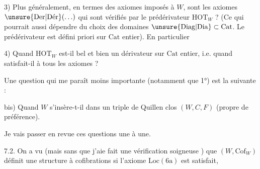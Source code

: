 3) Plus généralement, en termes des axiomes imposés à $W$,  sont les axiomes $\unsure{\mathrm{Der}|\mathrm{D\acute er}}(\ldots)$ qui sont vérifiés par le prédérivateur $\mathrm{HOT}_W$ ? (Ce qui pourrait aussi dépendre du choix des domaines $\unsure{\mathrm{Diag}|\mathrm{Dia}}\subset\mathrm{Cat}$. Le prédérivateur est défini  priori sur $\mathrm{Cat}$  entier). En particulier

4) Quand $\mathrm{HOT}_W$ est-il bel et bien un dérivateur sur $\mathrm{Cat}$  entier, i.e. quand satisfait-il à tous les axiomes ?

Une question qui me paraît moins importante (notamment que 1°) est la suivante :

 bis) Quand $W$ s'insère-t-il dans un triple de Quillen clos $(W,C,F)$ (propre de préférence).

Je vais passer en revue ces questions une à une.

7.2. On a vu (mais sans que j'aie fait une vérification soigneuse )
 que $(W,\mathrm{Cof}_W)$ définit une structure à cofibrations si l'axiome \uline{$\mathrm{Loc}(6\mathrm{a})$} est satisfait,
